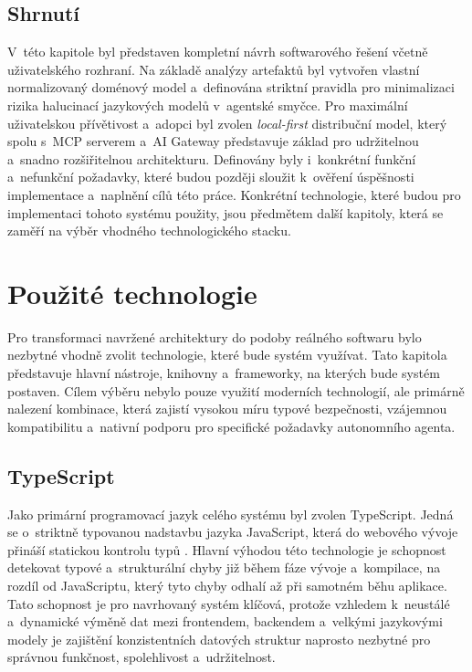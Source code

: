 \documentclass[czech, ing, kiv, he, iso690numb, viewonly]{fasthesis}
\begin{document}
\section{Shrnutí}
V~této kapitole byl představen kompletní návrh softwarového řešení včetně uživatelského rozhraní.
Na základě analýzy artefaktů byl vytvořen vlastní normalizovaný doménový model a~definována 
striktní pravidla pro minimalizaci rizika halucinací jazykových modelů v~agentské smyčce.
Pro maximální uživatelskou přívětivost a~adopci byl zvolen \textit{local-first} distribuční model,
který spolu s~MCP serverem a~AI Gateway představuje základ pro udržitelnou a~snadno rozšiřitelnou architekturu.
Definovány byly i~konkrétní funkční a~nefunkční požadavky, které budou později sloužit k~ověření úspěšnosti implementace a~naplnění cílů této práce.
Konkrétní technologie, které budou pro implementaci tohoto systému použity, jsou předmětem další kapitoly, která se zaměří na výběr vhodného technologického stacku.

\chapter{Použité technologie}\label{chapter:used_technologies}
Pro transformaci navržené architektury do podoby reálného softwaru 
bylo nezbytné vhodně zvolit technologie, které bude systém využívat. 
Tato kapitola představuje hlavní nástroje, knihovny a~frameworky, na kterých bude systém postaven.
Cílem výběru nebylo pouze využití moderních technologií, ale primárně nalezení kombinace, která 
 zajistí vysokou míru typové bezpečnosti, vzájemnou kompatibilitu a~nativní podporu pro specifické požadavky autonomního agenta.

\section{TypeScript}
Jako primární programovací jazyk celého systému byl zvolen TypeScript.
Jedná se o~striktně typovanou nadstavbu jazyka JavaScript, která do webového vývoje přináší statickou kontrolu typů \cite{bierman2014understanding, richards2015concrete}.
Hlavní výhodou této technologie je schopnost detekovat typové a~strukturální chyby již během fáze vývoje a~kompilace, na rozdíl 
od JavaScriptu, který tyto chyby odhalí až při samotném běhu aplikace. Tato schopnost je pro navrhovaný systém klíčová, 
protože vzhledem k~neustálé a~dynamické výměně dat mezi frontendem, backendem a~velkými jazykovými modely je 
zajištění konzistentních datových struktur naprosto nezbytné pro správnou funkčnost, spolehlivost a~udržitelnost.
\end{document}
